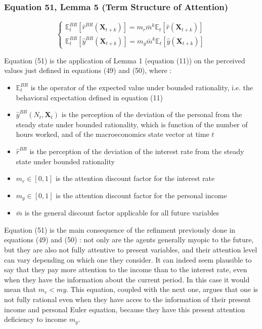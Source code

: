 \documentclass{article}
\begin{document}
\subsubsection*{Equation 51, Lemma 5 (Term Structure of Attention)}

\begin{equation}\tag{51}
    \begin{cases}
        \mathbb{E}_{t}^{BR}\left[\hat{r}^{BR}(\textbf{X}_{t+k})\right]=m_{r}\bar{m}^{k}\mathbb{E}_{t}\left[\hat{r}(\textbf{X}_{t+k})\right] \\
        \mathbb{E}_{t}^{BR}\left[\hat{y}^{BR}(\textbf{X}_{t+k})\right]=m_{y}\bar{m}^{k}\mathbb{E}_{t}\left[\hat{y}(\textbf{X}_{t+k})\right]
    \end{cases}
\end{equation}

Equation (51) is the application of Lemma 1 (equation (11)) on the perceived values just defined in equations (49) and (50), where : 
\begin{itemize}
    \item $\mathbb{E}_{t}^{BR}$ is the operator of the expected value under bounded rationality, i.e. the behavioral expectation defined in equation (11)
    \item $\hat{y}^{BR}(N_{t},\textbf{X}_{t})$ is the perception of the deviation of the personal from the steady state under bounded rationality, which is function of the number of hours worked, and of the macroeconomics state vector at time $t$
    \item $\hat{r}^{BR}$ is the perception of the deviation of the interest rate from the steady state under bounded rationality
    \item $m_{r}\in\left[0,1\right]$ is the attention discount factor for the interest rate
    \item $m_{y}\in\left[0,1\right]$ is the attention discount factor for the personal income
    \item $\bar{m}$ is the general discount factor applicable for all future variables
\end{itemize}

Equation (51) is the main consequence of the refinment previously done in equations (49) and (50) : not only are the agents generally myopic to the future, but they are also not fully attentive to present variables, and their attention level can vary depending on which one they consider.
It can indeed seem plausible to say that they pay more attention to the income than to the interest rate, even when they have the information about the current period. In this case it would mean that $m_{r}<m{y}$. 
This equation, coupled with the next one, argues that one is not fully rational even when they have acces to the information of their present income and personal Euler equation, because they have this present attention deficiency to income $m_{y}$.
\end{document}
